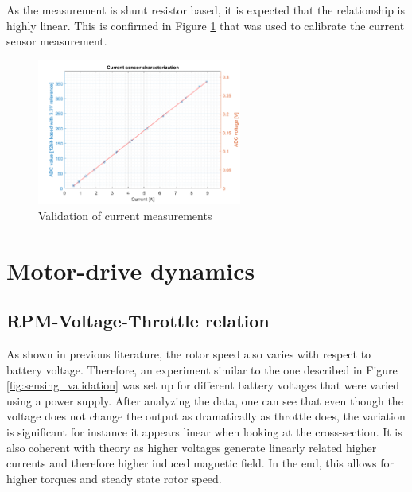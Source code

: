 As the measurement is shunt resistor based, it is expected that the relationship is highly linear. This is confirmed in Figure \ref{fig:current_validation} that was used to calibrate the current sensor measurement. 
\begin{figure} 
    \centering
    \includegraphics[width=0.6\textwidth]{images/current_validation.png}
    \caption{Validation of current measurements}
    \label{fig:current_validation}
\end{figure}

\section{Motor-drive dynamics}

\subsection{RPM-Voltage-Throttle relation}
As shown in previous literature, the rotor speed also varies with respect to battery voltage. Therefore, an experiment similar to the one described in Figure \ref{fig:sensing_validation} was set up for different battery voltages that were varied using a power supply. After analyzing the data, one can see that even though the voltage does not change the output as dramatically as throttle does, the variation is significant for instance it appears linear when looking at the cross-section. It is also coherent with theory as higher voltages generate linearly related higher currents and therefore higher induced magnetic field. In the end, this allows for higher torques and steady state rotor speed.\\

